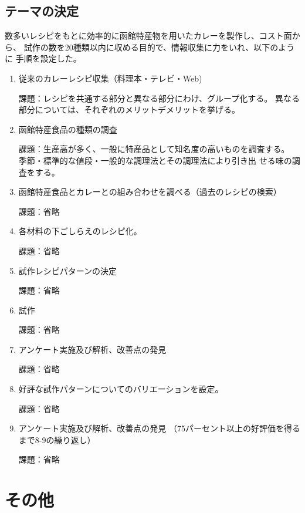 \documentclass[openany,11pt,papersize]{jsbook}
\begin{document}
\subsection{テーマの決定}


数多いレシピをもとに効率的に函館特産物を用いたカレーを製作し、コスト面から、 
試作の数を20種類以内に収める目的で、情報収集に力をいれ、以下のように 
手順を設定した。

\begin{enumerate}
\item 従来のカレーレシピ収集（料理本・テレビ・Web)
\par 課題：レシピを共通する部分と異なる部分にわけ、グループ化する。
     異なる部分については、それぞれのメリットデメリットを挙げる。　　

\item 函館特産食品の種類の調査
\par 課題：生産高が多く、一般に特産品として知名度の高いものを調査する。
           季節・標準的な値段・一般的な調理法とその調理法により引き出
           せる味の調査をする。　　
 　 
\item 函館特産食品とカレーとの組み合わせを調べる（過去のレシピの検索）
\par 課題：省略
 　　　 
\item 各材料の下ごしらえのレシピ化。
\par 課題：省略
 　　　 
\item 試作レシピパターンの決定
\par 課題：省略
 　　　 
\item 試作
\par 課題：省略
 　　　 
\item アンケート実施及び解析、改善点の発見
\par 課題：省略

\item 好評な試作パターンについてのバリエーションを設定。　　　
\par 課題：省略
 　　　 
\item アンケート実施及び解析、改善点の発見
（75パーセント以上の好評価を得るまで8-9の繰り返し）
\par 課題：省略
\end{enumerate}


\section{その他}
\end{document}
